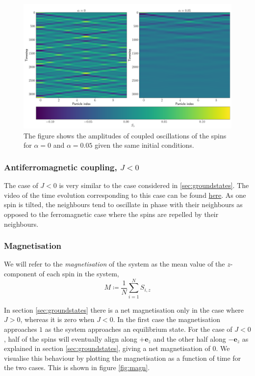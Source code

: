\begin{figure}[htb]
	\centering
	\includegraphics[width=\columnwidth]{../fig/damped_vs_undamped.pdf}
	\caption{The figure shows the amplitudes of coupled oscillations of the spins for $\alpha = 0$ and $\alpha = 0.05$ given the same initial conditions.}
	\label{fig:damped_heat}
\end{figure}

\subsubsection{Antiferromagnetic coupling, $J<0$}

The case of $J<0$ is very similar to the case considered in \ref{sec:groundstates}. The video of the time evolution corresponding to this case can be found \href{https://folk.ntnu.no/sondrdl/spinwaves/coupled_spins_anti.mp4}{here}. As one spin is tilted, the neighbours tend to oscillate in phase with their neighbours as opposed to the ferromagnetic case where the spins are repelled by their neighbours. 

\subsubsection{Magnetisation}

\begin{definition}
	We will refer to the \textit{magnetisation} of the system as the mean value of the $z$-component of each spin in the system,
	\[
		M \coloneqq \frac{1}{N} \sum_{i=1}^N S_{i,z}
	\]
\end{definition}

In section \ref{sec:groundstates} there is a net magnetisation only in the case where $J>0$, whereas it is zero when $J<0$. In the first case the magnetisation approaches $1$ as the system approaches an equilibrium state. For the case of $J<0$, half of the spins will eventually align along $+\mathbf{e}_z$ and the other half along $-\mathbf{e}_z$ as explained in section \ref{sec:groundstates}, giving a net magnetisation of $0$. We visualise this behaviour by plotting the magnetisation as a function of time for the two cases. This is shown in figure \ref{fig:magn}.

